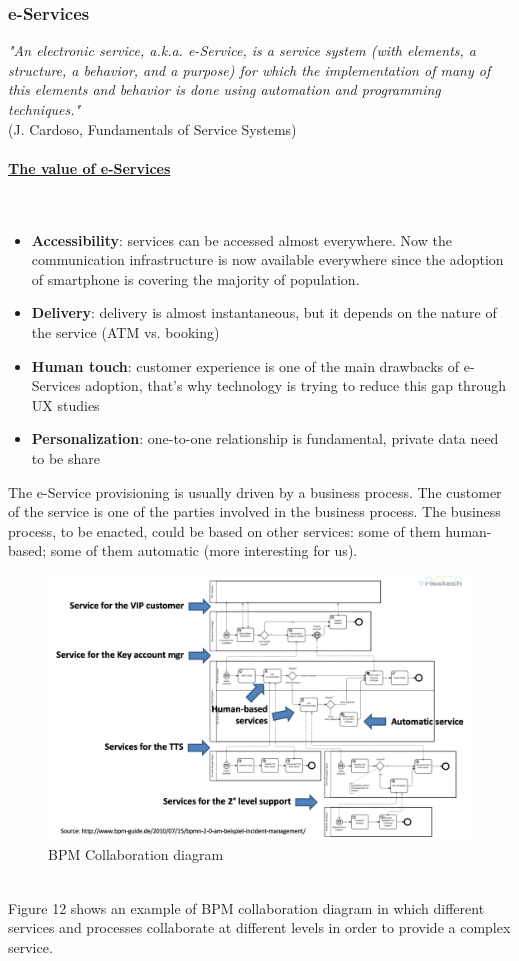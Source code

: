 \documentclass[10pt,a4paper]{article}
\newcommand{\myparagraph}[1]{\paragraph{\uline{#1}}\mbox{}\\[0.05in]}
\begin{document}
\subsubsection{e-Services}
\textit{"An electronic service, a.k.a. e-Service, is a service system (with elements, a structure, a behavior, and a purpose) for which the implementation of many of this elements and behavior is done using automation and programming techniques."} \\(J. Cardoso, Fundamentals of Service Systems)
\myparagraph{The value of e-Services}
\begin{itemize}
	\item \textbf{Accessibility}: services can be accessed almost everywhere. Now the communication infrastructure is now available everywhere since the adoption of smartphone is covering the majority of population.
	\item \textbf{Delivery}: delivery is almost instantaneous, but it depends on the nature of the service (ATM vs. booking)
	\item \textbf{Human touch}: customer experience is one of the main drawbacks of e-Services adoption, that's why technology is trying to reduce this gap through UX studies
	\item \textbf{Personalization}: one-to-one relationship is fundamental, private data need to be share
\end{itemize}
The e-Service provisioning is usually driven by a business process. The customer of the service is one of the parties involved in the business process. The business process, to be enacted, could be based on other services: some of them human-based; some of them automatic (more interesting for us).
\begin{figure}[ht!]
 \hfill \includegraphics[width=\linewidth]{images/business-process}\hspace*{\fill}
 \caption{BPM Collaboration diagram}
  \label{fig:business-process}
\end{figure} \\
Figure 12 shows an example of BPM collaboration diagram in which different services and processes collaborate at different levels in order to provide a complex service. 
\pagebreak
\end{document}
